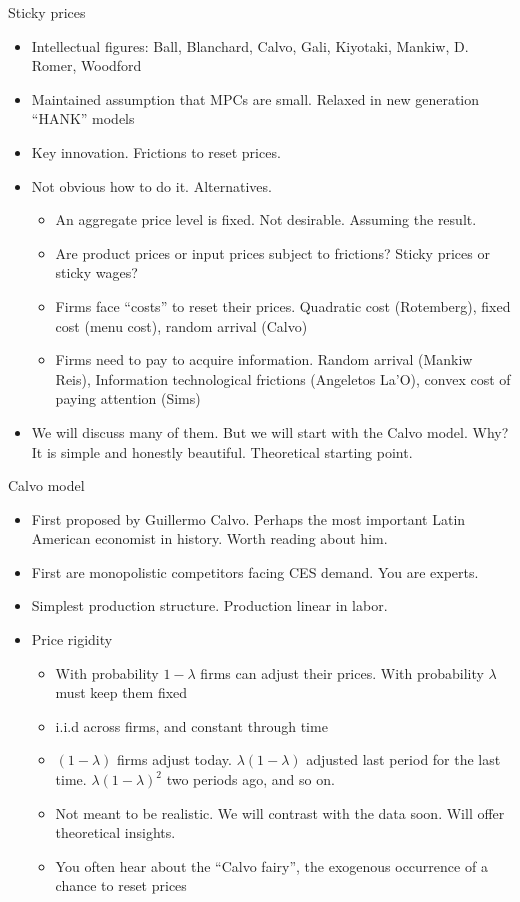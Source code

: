 \documentclass[11pt,aspectratio=169,xcolor={dvipsnames},hyperref={pdftex,pdfpagemode=UseNone,hidelinks,pdfdisplaydoctitle=true},usepdftitle=false]{beamer}
\begin{document}
\begin{frame}{Sticky prices}
\begin{itemize}
\item Intellectual figures: Ball, Blanchard, Calvo, Gali, Kiyotaki, Mankiw, D. Romer, Woodford
\pause
\item Maintained assumption that MPCs are small. Relaxed in new generation ``HANK'' models
\pause
\item Key innovation. Frictions to reset prices.
\pause
\item Not obvious how to do it. Alternatives.
\pause
\begin{itemize}
\item An aggregate price level is fixed. Not desirable. Assuming the result.
\pause
\item Are product prices or input prices subject to frictions? Sticky prices or sticky wages?
\pause
\item Firms face ``costs'' to reset their prices. Quadratic cost (Rotemberg), fixed cost (menu cost), random arrival (Calvo)
\pause
\item Firms need to pay to acquire information. Random arrival (Mankiw Reis), Information technological frictions (Angeletos La'O), convex cost of paying attention (Sims)
\end{itemize}
\pause
\item We will discuss many of them. But we will start with the Calvo model. Why? It is simple and honestly beautiful. Theoretical starting point.
\end{itemize}
\end{frame}

\begin{frame}{Calvo model}
\begin{itemize}
\item First proposed by Guillermo Calvo. Perhaps the most important Latin American economist in history. Worth reading about him. \pause
\item First are monopolistic competitors facing CES demand. You are experts.
\pause
\item Simplest production structure. Production linear in labor.
\pause
\item Price rigidity
\begin{itemize}
\item With probability $1-\lambda$ firms can adjust their prices. With probability $\lambda$ must keep them fixed
\pause
\item i.i.d across firms, and constant through time
\pause
\item $(1-\lambda)$ firms adjust today. $\lambda(1-\lambda)$ adjusted last period for the last time. $\lambda(1-\lambda)^2$ two periods ago, and so on.
\pause
\item Not meant to be realistic. We will contrast with the data soon. Will offer theoretical insights.
\pause
\item You often hear about the ``Calvo fairy'', the exogenous occurrence of a chance to reset prices
\end{itemize}
\end{itemize}
\end{frame}
\end{document}
